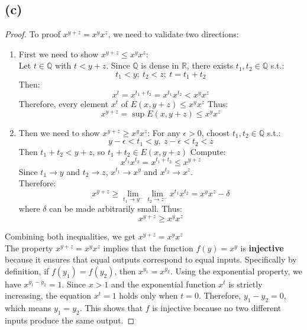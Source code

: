 \documentclass{article}
\begin{document}
\subsection*{(c)}
\begin{proof}
    To proof $x^{y + z} = x^y x^z$, we need to validate two directions:
    \\
    \begin{enumerate}
        \item First we need to show $x^{y + z} \leq x^y x^z$:
        \\
        Let $t \in \mathbb{Q}$ with $t < y + z$.
        Since $\mathbb{Q}$ is dense in $\mathbb{R}$, there exists $t_1, t_2 \in \mathbb{Q}$ s.t.:
        \[ t_1 < y; \ t_2 < z; \ t = t_1 + t_2 \]
        Then:
        \[ x^t = x^{t_1 + t_2} = x^{t_1}x^{t_2} < x^yx^z \]
        Therefore, every element $x^t$ of $E(x, y + z) \leq x^yx^z$
        Thus:
        \[ x^{y + z} = \sup E(x, y + z) \leq x^y x^z \]
        \item Then we need to show $x^{y + z} \geq x^y x^z$:
        For any $\epsilon > 0$, choost $t_1, t_2 \in \mathbb{Q}$ s.t.:
        \[ y - \epsilon < t_1 < y, \ z - \epsilon < t_2 < z \]
        Then $t_1 + t_2 < y + z$, so $t_1 + t_2 \in E(x, y + z)$
        Compute: 
        \[ x^{t_1}x^{t_2} = x^{t_1 + t_2} \leq x^{y + z} \]
        Since $t_1 \rightarrow y$ and $t_2 \rightarrow z$, $x^{t_1} \rightarrow x^y$ and $x^{t_2} \rightarrow x^z$.
        \\
        Therefore:
        \[ x^{y + z} \geq \lim_{t_1 \rightarrow y^{-}} \lim_{t_2 \rightarrow z^{-}} x^{t_1} x^{t_2} = x^y x^z - \delta \]
        where $\delta$ can be made arbitrarily small. Thus:
        \[ x^{y + z} \geq x^y x^z \]
    \end{enumerate}
    Combining both inequalities, we get $x^{y + z} = x^y x^z$
    \\
    The property \( x^{y+z} = x^y x^z \) implies that the function \( f(y) = x^y \) is \textbf{injective} because it ensures that equal outputs correspond to equal inputs. 
    Specifically by definition, if \( f(y_1) = f(y_2) \), then \( x^{y_1} = x^{y_2} \). Using the exponential property, we have \( x^{y_1 - y_2} = 1 \). Since \( x > 1 \) and the exponential function \( x^t \) is strictly increasing, the equation \( x^t = 1 \) holds only when \( t = 0 \). Therefore, \( y_1 - y_2 = 0 \), which means \( y_1 = y_2 \). 
    This shows that \( f \) is injective because no two different inputs produce the same output.
\end{proof}
\end{document}
